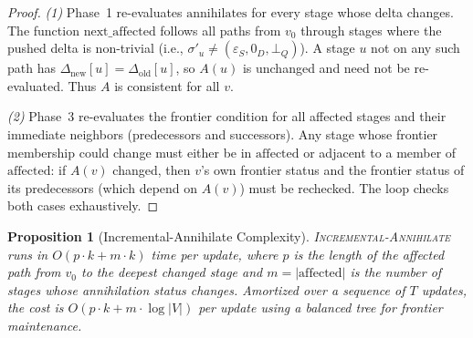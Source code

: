\documentclass[11pt,a4paper]{article}
\newtheorem{proposition}[theorem]{Proposition}
\theoremstyle{definition}
\newcommand{\epsS}{\varepsilon_S}
\newcommand{\zeroD}{0_D}
\newcommand{\botQ}{\bot_Q}
\newcommand{\ann}{\mathrm{annihilates}}
\begin{document}
\begin{proof}
\emph{(1)}  Phase~1 re-evaluates $\ann$ for every stage whose delta
changes.  The function $\mathrm{next\_affected}$ follows all paths from
$v_0$ through stages where the pushed delta is non-trivial
(i.e., $\sigma'_u \neq (\epsS, \zeroD, \botQ)$).  A stage $u$ not on
any such path has $\Delta_{\mathrm{new}}[u] = \Delta_{\mathrm{old}}[u]$,
so $A(u)$ is unchanged and need not be re-evaluated.  Thus $A$ is
consistent for all $v$.

\emph{(2)}  Phase~3 re-evaluates the frontier condition for all affected
stages and their immediate neighbors (predecessors and successors).  Any
stage whose frontier membership could change must either be in
$\mathrm{affected}$ or adjacent to a member of $\mathrm{affected}$:
if $A(v)$ changed, then $v$'s own frontier status and the frontier status
of its predecessors (which depend on $A(v)$) must be rechecked.  The loop
checks both cases exhaustively.
\end{proof}

\begin{proposition}[Incremental-Annihilate Complexity]\label{prop:inc-ann-complexity}
\textsc{Incremental-Annihilate} runs in $O(p \cdot k + m \cdot k)$ time
per update, where $p$ is the length of the affected path from $v_0$ to the
deepest changed stage and $m = |\mathrm{affected}|$ is the number of stages
whose annihilation status changes.  Amortized over a sequence of $T$ updates,
the cost is $O(p \cdot k + m \cdot \log |V|)$ per update using a balanced
tree for frontier maintenance.
\end{proposition}
\end{document}
